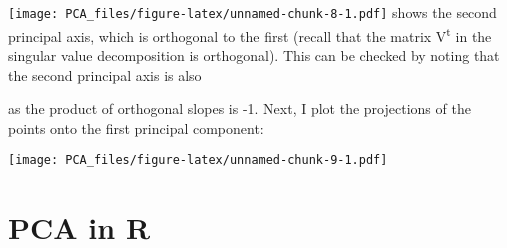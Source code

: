 \documentclass[]{article}
\newenvironment{Shaded}{\begin{snugshade}}{\end{snugshade}}
\newcommand{\KeywordTok}[1]{\textcolor[rgb]{0.13,0.29,0.53}{\textbf{#1}}}
\newcommand{\DataTypeTok}[1]{\textcolor[rgb]{0.13,0.29,0.53}{#1}}
\newcommand{\DecValTok}[1]{\textcolor[rgb]{0.00,0.00,0.81}{#1}}
\newcommand{\StringTok}[1]{\textcolor[rgb]{0.31,0.60,0.02}{#1}}
\newcommand{\CommentTok}[1]{\textcolor[rgb]{0.56,0.35,0.01}{\textit{#1}}}
\newcommand{\OtherTok}[1]{\textcolor[rgb]{0.56,0.35,0.01}{#1}}
\newcommand{\OperatorTok}[1]{\textcolor[rgb]{0.81,0.36,0.00}{\textbf{#1}}}
\newcommand{\NormalTok}[1]{#1}
\begin{document}
\texttt{[image: PCA\_files/figure-latex/unnamed-chunk-8-1.pdf]} shows the
second principal axis, which is orthogonal to the first (recall that the
matrix V\textsuperscript{t} in the singular value decomposition is
orthogonal). This can be checked by noting that the second principal
axis is also

as the product of orthogonal slopes is -1. Next, I plot the projections
of the points onto the first principal component:

\begin{Shaded}
\end{Shaded}

\texttt{[image: PCA\_files/figure-latex/unnamed-chunk-9-1.pdf]}

\hypertarget{pca-in-r}{%
\section{PCA in R}\label{pca-in-r}}
\end{document}
